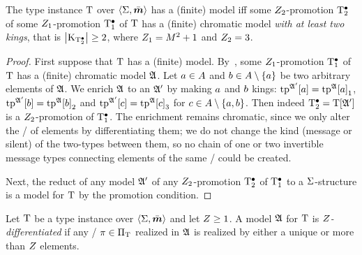 \begin{remark}\label{rem:prop-twokings}
The type instance $\mathrm{T}$ over $\left\langle \mathrm{\Sigma},\bar{\bm{m}} \right\rangle$ has a (finite) model
iff some $Z_{2}$-promotion $\mathrm{T}_{2}^{\bullet}$
of some $Z_{1}$-promotion $\mathrm{T}_{1}^{\bullet}$ 
of $\mathrm{T}$ has a (finite) chromatic model \emph{with at least two kings}, that is
$\left|{\mathrm{K}}_{\mathrm{T}_{2}^{\bullet}}\right|\geq2$,
where $Z_{1} = M^2+1$ and $Z_{2} = 3$.
\end{remark}
\begin{proof}
First suppose that $\mathrm{T}$ has a (finite) model.
By~,
some $Z_{1}$-promotion $\mathrm{T}_{1}^{\bullet}$
of $\mathrm{T}$ has a (finite) chromatic model $\mathfrak{A}$.
Let $a\in A$ and $b\in A\setminus\left\{a\right\}$ be two arbitrary elements of
$\mathfrak{A}$.
We enrich $\mathfrak{A}$ to an $\mathfrak{A'}$ by making $a$ and $b$ kings:
$\operatorname{tp}^{\mathfrak{A'}}[a] = {\operatorname{tp}^{\mathfrak{A}}[a]}_{1}$,
$\operatorname{tp}^{\mathfrak{A'}}[b] = {\operatorname{tp}^{\mathfrak{A}}[b]}_{2}$
and $\operatorname{tp}^{\mathfrak{A'}}[c] = {\operatorname{tp}^{\mathfrak{A}}[c]}_{3}$ for $c\in A\setminus\left\{a,b\right\}$.
Then indeed $\mathrm{T}_{2}^{\bullet} = \mathrm{T}[\mathfrak{A'}]$ is a $Z_{2}$-promotion of $\mathrm{T}_{1}^{\bullet}$.
The enrichment remains chromatic, since we only alter the \onetypes/ of elements
by differentiating them; we do not change the kind (message or silent) of the
two-types between them, so no chain of one or two invertible message types
connecting elements of the same \onetype/ could be created.

Next, the reduct of any model $\mathfrak{A'}$ of any $Z_{2}$-promotion $\mathrm{T}_{2}^{\bullet}$ of
$\mathrm{T}_{1}^{\bullet}$ to a $\mathrm{\Sigma}$-structure is a model for $\mathrm{T}$ by the promotion
condition.
\end{proof}

\begin{definition}
Let $\mathrm{T}$ be a type instance over $\left\langle \mathrm{\Sigma},\bar{\bm{m}} \right\rangle$ and let $Z\geq1$.
A model $\mathfrak{A}$ for $\mathrm{T}$ is \emph{$Z$-differentiated} if any \onetype/
$\pi\in{\Pi}_{\mathrm{T}}$ realized in $\mathfrak{A}$ is realized by either a unique or more than
$Z$ elements.
\end{definition}

